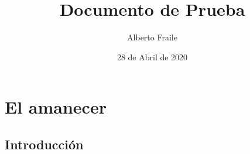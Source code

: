 \documentclass[a4paper, 11pt, titlepage]{article}
\title{Documento de Prueba}
\author{Alberto Fraile}
\date{28 de Abril de 2020}
\begin{document}
\maketitle
\tableofcontents
\newpage

\chapter{El amanecer}
\section{Introducción}
\end{document}
